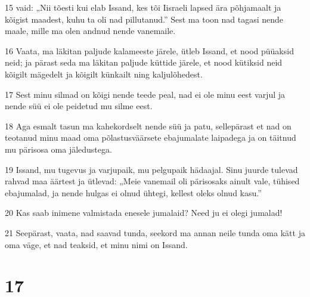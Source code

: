 \par 15 vaid: „Nii tõesti kui elab Issand, kes tõi Iisraeli lapsed ära põhjamaalt ja kõigist maadest, kuhu ta oli nad pillutanud.” Sest ma toon nad tagasi nende maale, mille ma olen andnud nende vanemaile.
\par 16 Vaata, ma läkitan paljude kalameeste järele, ütleb Issand, et nood püüaksid neid; ja pärast seda ma läkitan paljude küttide järele, et nood kütiksid neid kõigilt mägedelt ja kõigilt künkailt ning kaljulõhedest.
\par 17 Sest minu silmad on kõigi nende teede peal, nad ei ole minu eest varjul ja nende süü ei ole peidetud mu silme eest.
\par 18 Aga esmalt tasun ma kahekordselt nende süü ja patu, sellepärast et nad on teotanud minu maad oma põlastusväärsete ebajumalate laipadega ja on täitnud mu pärisosa oma jäledustega.
\par 19 Issand, mu tugevus ja varjupaik, mu pelgupaik hädaajal. Sinu juurde tulevad rahvad maa äärtest ja ütlevad: „Meie vanemail oli pärisosaks ainult vale, tühised ebajumalad, ja nende hulgas ei olnud ühtegi, kellest oleks olnud kasu.”
\par 20 Kas saab inimene valmistada enesele jumalaid? Need ju ei olegi jumalad!
\par 21 Seepärast, vaata, nad saavad tunda, seekord ma annan neile tunda oma kätt ja oma väge, et nad teaksid, et minu nimi on Issand.

\chapter{17}


